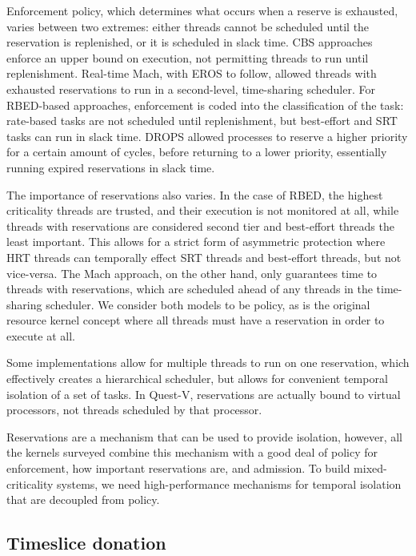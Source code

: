 Enforcement policy, which determines what occurs when a reserve is exhausted,
varies between two extremes: either threads cannot be scheduled until the reservation is
replenished, or it is scheduled in slack time. 
\gls{CBS} approaches enforce an upper bound on execution, not permitting threads to run until 
replenishment. Real-time Mach, with EROS to follow, allowed threads with exhausted reservations to
run in a second-level, time-sharing scheduler. For RBED-based approaches, enforcement is coded into
the classification of the task: rate-based tasks are not scheduled until replenishment, but
best-effort and \gls{SRT} tasks can run in slack time. 
\gls{DROPS} allowed processes to reserve a 
higher priority for a certain amount of cycles, before returning to a lower priority, essentially
running expired reservations in slack time. 

The importance of reservations also varies. In the case of RBED, the highest criticality threads
are trusted, and their execution is not monitored at all, while threads with reservations are
considered second tier and best-effort threads the least important. This allows for a strict form 
of asymmetric protection where \gls{HRT} threads can temporally effect \gls{SRT} threads and
best-effort threads, but not vice-versa. The Mach approach, on the other hand, only guarantees time
to threads with reservations, which are scheduled ahead of any threads in the time-sharing
scheduler. We consider both models to be policy, as is the original resource kernel concept where
all threads must have a reservation in order to execute at all.  

Some implementations allow for multiple threads to run on one reservation, which effectively creates
a hierarchical scheduler, but allows for convenient temporal isolation of a set of tasks. In
Quest-V, reservations are actually bound to virtual processors, not threads scheduled by that
processor. 

Reservations are a mechanism that can be used to provide isolation, however, all the kernels
surveyed combine this mechanism with a good deal of policy for enforcement, how important
reservations are, and admission. To build mixed-criticality systems, we
need high-performance mechanisms for temporal isolation that are decoupled from policy.

\subsection{Timeslice donation}
\label{sec:os-timeslice-donation}

